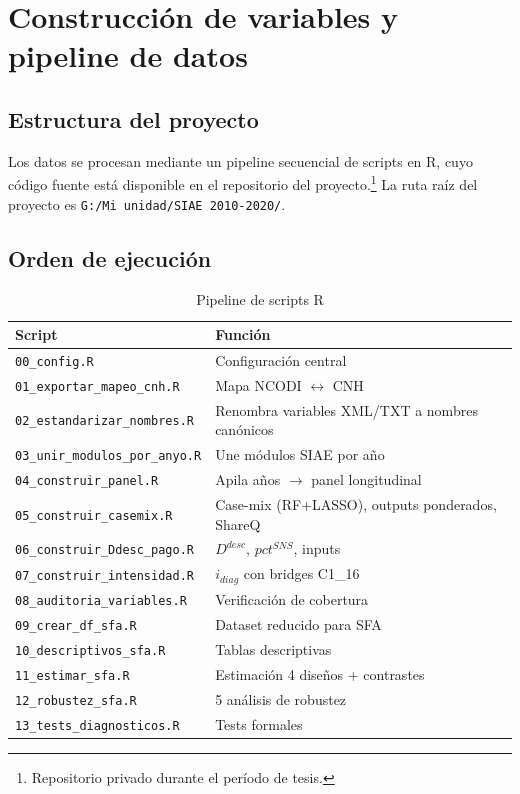 ﻿\chapter{Construcción de variables y pipeline de datos}
\label{app:pipeline}

\section{Estructura del proyecto}

Los datos se procesan mediante un pipeline secuencial de scripts en R, cuyo código fuente está disponible en el repositorio del proyecto.\footnote{Repositorio privado durante el período de tesis.} La ruta raíz del proyecto es \texttt{G:/Mi unidad/SIAE 2010-2020/}.

\section{Orden de ejecución}

\begin{table}[htbp]
\centering
\caption{Pipeline de scripts R}
\label{tab:pipeline}
\small
\begin{tabular}{p{4cm}p{9cm}}
\toprule
\textbf{Script} & \textbf{Función} \\
\midrule
\texttt{00\_config.R} & Configuración central \\
\texttt{01\_exportar\_mapeo\_cnh.R} & Mapa NCODI $\leftrightarrow$ CNH \\
\texttt{02\_estandarizar\_nombres.R} & Renombra variables XML/TXT a nombres canónicos \\
\texttt{03\_unir\_modulos\_por\_anyo.R} & Une módulos SIAE por año \\
\texttt{04\_construir\_panel.R} & Apila años $\rightarrow$ panel longitudinal \\
\texttt{05\_construir\_casemix.R} & Case-mix (RF+LASSO), outputs ponderados, ShareQ \\
\texttt{06\_construir\_Ddesc\_pago.R} & $D^{desc}$, $pct^{SNS}$, inputs \\
\texttt{07\_construir\_intensidad.R} & $i_{diag}$ con bridges C1\_16 \\
\texttt{08\_auditoria\_variables.R} & Verificación de cobertura \\
\texttt{09\_crear\_df\_sfa.R} & Dataset reducido para SFA \\
\texttt{10\_descriptivos\_sfa.R} & Tablas descriptivas \\
\texttt{11\_estimar\_sfa.R} & Estimación 4 diseños + contrastes \\
\texttt{12\_robustez\_sfa.R} & 5 análisis de robustez \\
\texttt{13\_tests\_diagnosticos.R} & Tests formales \\
\bottomrule
\end{tabular}
\end{table}

